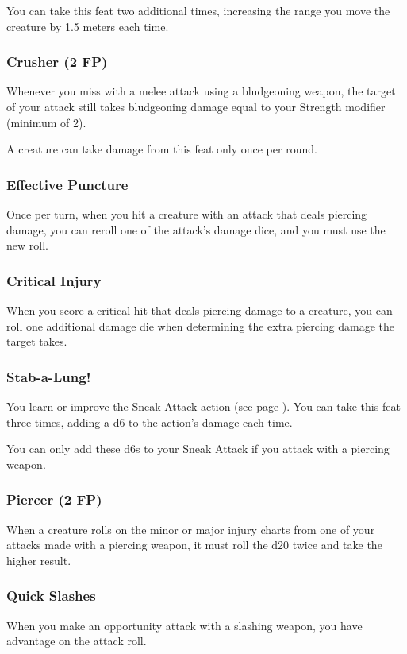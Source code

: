     You can take this feat two additional times, increasing the range you move the creature by 1.5 meters each time.
\subsubsection{Crusher (2 FP)} \label{feat::crusher}
    Whenever you miss with a melee attack using a bludgeoning weapon, the target of your attack still takes bludgeoning damage equal to your Strength modifier (minimum of 2).

    A creature can take damage from this feat only once per round.
\subsubsection{Effective Puncture} \label{feat::effectivepuncture}
    Once per turn, when you hit a creature with an attack that deals piercing damage, you can reroll one of the attack's damage dice, and you must use the new roll.
\subsubsection{Critical Injury} \label{feat::criticalinjury}
    When you score a critical hit that deals piercing damage to a creature, you can roll one additional damage die when determining the extra piercing damage the target takes.
\subsubsection{Stab-a-Lung!} \label{feat::stabalung}
    You learn or improve the Sneak Attack action (see page \pageref{act:sneakattack}).
    You can take this feat three times, adding a d6 to the action's damage each time.

    You can only add these d6s to your Sneak Attack if you attack with a piercing weapon.
\subsubsection{Piercer (2 FP)} \label{feat::piercer}
    When a creature rolls on the minor or major injury charts from one of your attacks made with a piercing weapon, it must roll the d20 twice and take the higher result.
\subsubsection{Quick Slashes} \label{feat::quickslashes}
    When you make an opportunity attack with a slashing weapon, you have advantage on the attack roll.
